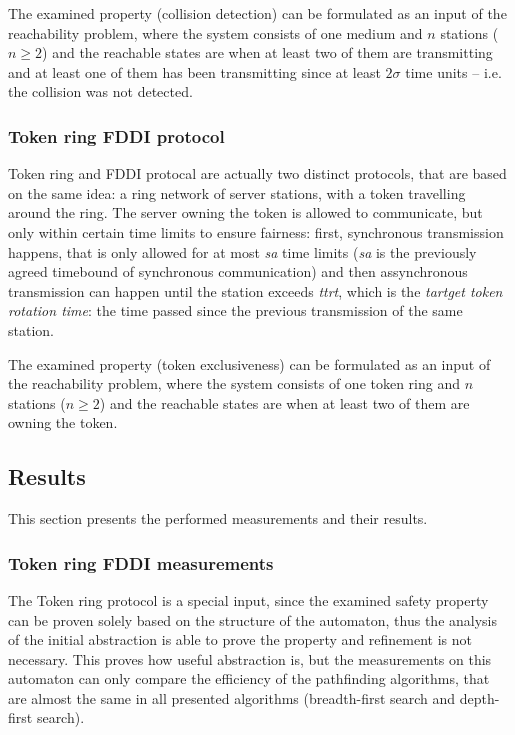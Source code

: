 The examined property (collision detection) can be formulated as an input of the reachability problem, where the system consists of one medium and $n$ stations ($n \geq 2$) and the reachable states are when at least two of them are transmitting and at least one of them has been transmitting since at least $2\sigma$ time units -- i.e. the collision was not detected.

\subsubsection{Token ring FDDI protocol}

Token ring and FDDI protocal are actually two distinct protocols, that are based on the same idea: a ring network of server stations, with a token travelling around the ring. The server owning the token is allowed to communicate, but only within certain time limits to ensure fairness: first, synchronous transmission happens, that is only allowed for at most \emph{sa} time limits (\emph{sa} is the previously agreed timebound of synchronous communication) and then assynchronous transmission can happen until the station exceeds \emph{ttrt}, which is the \emph{tartget token rotation time}: the time passed since the previous transmission of the same station.

The examined property (token exclusiveness) can be formulated as an input of the reachability problem, where the system consists of one token ring and $n$ stations ($n \geq 2$) and the reachable states are when at least two of them are owning the token.

\subsection{Results}

This section presents the performed measurements and their results.

\subsubsection{Token ring FDDI measurements}

The Token ring protocol is a special input, since the examined safety property can be proven solely based on the structure of the automaton, thus the analysis of the initial abstraction is able to prove the property and refinement is not necessary. This proves how useful abstraction is, but the measurements on this automaton can only compare the efficiency of the pathfinding algorithms, that are almost the same in all presented algorithms (breadth-first search and depth-first search).

